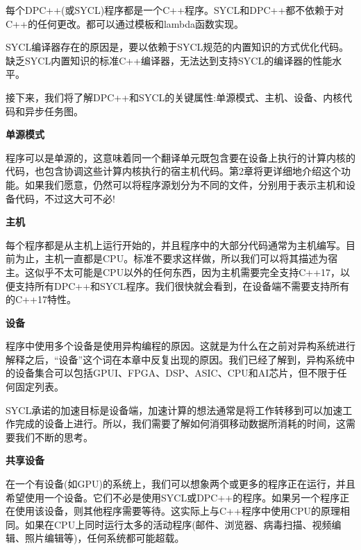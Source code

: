 每个DPC++(或SYCL)程序都是一个C++程序。SYCL和DPC++都不依赖于对C++的任何更改。都可以通过模板和lambda函数实现。\par
SYCL编译器存在的原因是，要以依赖于SYCL规范的内置知识的方式优化代码。缺乏SYCL内置知识的标准C++编译器，无法达到支持SYCL的编译器的性能水平。\par
接下来，我们将了解DPC++和SYCL的关键属性:单源模式、主机、设备、内核代码和异步任务图。\par

\hspace*{\fill} \par %
\textbf{单源模式}

程序可以是单源的，这意味着同一个翻译单元既包含要在设备上执行的计算内核的代码，也包含协调这些计算内核执行的宿主机代码。第2章将更详细地介绍这个功能。如果我们愿意，仍然可以将程序源划分为不同的文件，分别用于表示主机和设备代码，不过这大可不必!\par

\hspace*{\fill} \par %
\textbf{主机}

每个程序都是从主机上运行开始的，并且程序中的大部分代码通常为主机编写。目前为止，主机一直都是CPU。标准不要求这样做，所以我们可以将其描述为宿主。这似乎不太可能是CPU以外的任何东西，因为主机需要完全支持C++17，以便支持所有DPC++和SYCL程序。我们很快就会看到，在设备端不需要支持所有的C++17特性。\par


\hspace*{\fill} \par %
\textbf{设备}

程序中使用多个设备是使用异构编程的原因。这就是为什么在之前对异构系统进行解释之后，“设备”这个词在本章中反复出现的原因。我们已经了解到，异构系统中的设备集合可以包括GPUI、FPGA、DSP、ASIC、CPU和AI芯片，但不限于任何固定列表。\par

SYCL承诺的加速目标是设备端，加速计算的想法通常是将工作转移到可以加速工作完成的设备上进行。所以，我们需要了解如何消弭移动数据所消耗的时间，这需要我们不断的思考。\par

\hspace*{\fill} \par %
\textbf{共享设备}

在一个有设备(如GPU)的系统上，我们可以想象两个或更多的程序正在运行，并且希望使用一个设备。它们不必是使用SYCL或DPC++的程序。如果另一个程序正在使用该设备，则其他程序需要等待。这实际上与C++程序中使用CPU的原理相同。如果在CPU上同时运行太多的活动程序(邮件、浏览器、病毒扫描、视频编辑、照片编辑等)，任何系统都可能超载。\par

